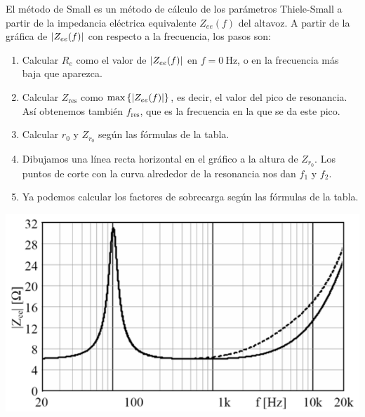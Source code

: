 \documentclass[a4paper, 8pt]{extarticle}
\begin{document}
\begin{multicols}{3}
    El método de Small es un método de cálculo de los parámetros Thiele-Small a partir de la impedancia eléctrica equivalente $Z_{ee}(f)$ del altavoz. A partir de la gráfica de $\abs{Z_{ee}(f)}$ con respecto a la frecuencia, los pasos son:
    \begin{enumerate}
        \item Calcular $R_e$ como el valor de $\abs{Z_{ee}(f)}$ en $f=\qty{0}{\Hz}$, o en la frecuencia más baja que aparezca.
        \item Calcular $Z _{\text{res}}$ como $\max \left\lbrace \abs{Z_{ee}(f)} \right\rbrace $, es decir, el valor del pico de resonancia. Así obtenemos también $f _{\text{res}}$, que es la frecuencia en la que se da este pico.
        \item Calcular $r_0$ y $Z_{r_0}$ según las fórmulas de la tabla.
        \item Dibujamos una línea recta horizontal en el gráfico a la altura de $Z_{r_0}$. Los puntos de corte con la curva alrededor de la resonancia nos dan $f_1$ y $f_2$.
        \item Ya podemos calcular los factores de sobrecarga según las fórmulas de la tabla.
    \end{enumerate}
    \begin{center}
        \includegraphics[width=0.7\linewidth]{images/Zeq.png}
    \end{center}


\end{multicols}
\end{document}
